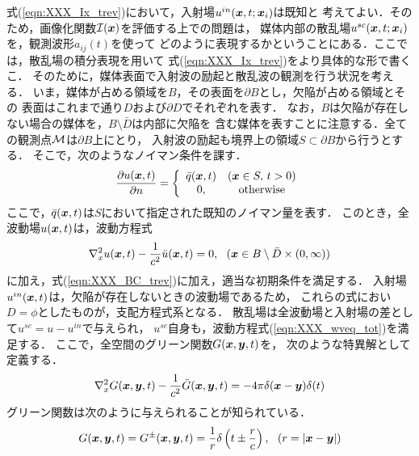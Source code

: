 式(\ref{eqn:XXX_Ix_trev})において，入射場$u^{in}(\mbox{\boldmath $x$},t;\mbox{\boldmath $x$}_i)$は既知と
考えてよい．そのため，画像化関数${\cal I}(\mbox{\boldmath $x$})$を評価する上での問題は，
媒体内部の散乱場$u^{sc}(\mbox{\boldmath $x$},t;\mbox{\boldmath $x$}_i)$を，観測波形$a_{ij}(t)$を使って
どのように表現するかということにある．ここでは，散乱場の積分表現を用いて
式(\ref{eqn:XXX_Ix_trev})をより具体的な形で書くこ． 
そのために，媒体表面で入射波の励起と散乱波の観測を行う状況を考える．
いま，媒体が占める領域を$B$，その表面を$\partial B$とし，欠陥が占める領域とその
表面はこれまで通り$D$および$\partial D$でそれぞれを表す．
なお，$B$は欠陥が存在しない場合の媒体を，$B\setminus \bar{D}$は内部に欠陥を
含む媒体を表すことに注意する．全ての観測点$\cal M$は$\partial B$上にとり，
入射波の励起も境界上の領域$S\subset \partial B$から行うとする．
そこで，次のようなノイマン条件を課す．
\begin{equation}
	\frac{\partial u(\mbox{\boldmath $x$},t)}{\partial n}
	=\left\{
		\begin{array}{cc}
			\bar{q}(\mbox{\boldmath $x$},t) & (\mbox{\boldmath $x$}\in S,\, t>0) \\
			0, & {\rm otherwise} 
		\end{array}
	\right.
	\label{eqn:XXX_BC_trev}
\end{equation}
ここで，$\bar{q}(\mbox{\boldmath $x$},t)$は$S$において指定された既知のノイマン量を表す．
このとき，全波動場$u(\mbox{\boldmath $x$},t)$は，波動方程式
\begin{equation}
	\nabla^2_x u(\mbox{\boldmath $x$},t)
	-
	\frac{1}{c^2}\ddot{u}(\mbox{\boldmath $x$},t)
	=
	0
	, \ \ (\mbox{\boldmath $x$} \in B\setminus \bar D \times (0,\infty))
	\label{eqn:XXX_wveq_tot}
\end{equation}
に加え，式(\ref{eqn:XXX_BC_trev})に加え，適当な初期条件を満足する．
入射場$u^{in}(\mbox{\boldmath $x$},t)$は，欠陥が存在しないときの波動場であるため，
これらの式におい$D=\phi$としたものが，支配方程式系となる．
散乱場は全波動場と入射場の差として$u^{sc}=u-u^{in}$で与えられ，
$u^{sc}$自身も，波動方程式(\ref{eqn:XXX_wveq_tot})を満足する．
ここで，全空間のグリーン関数$G(\mbox{\boldmath $x$},\mbox{\boldmath $y$},t)$を，
次のような特異解として定義する．
\begin{equation}
	\nabla^2_x G(\mbox{\boldmath $x$},\mbox{\boldmath $y$},t)
	-
	\frac{1}{c^2}\ddot{G}(\mbox{\boldmath $x$},\mbox{\boldmath $y$},t)
	=
	-4\pi \delta(\mbox{\boldmath $x$}-\mbox{\boldmath $y$})\delta(t)
	\label{eqn:XXX_Green_pm}
\end{equation}
グリーン関数は次のように与えられることが知られている．
\begin{equation}
	G(\fat{x},\fat{y},t)=G^{\pm}(\fat{x},\fat{y},t)
	=\frac{1}{r}\delta \left(t\pm \frac{r}{c}\right), 
	\ \ 
	(r=|\fat{x}-\fat{y}|)
	\label{eqn:XXX_Green_pm}
\end{equation}
